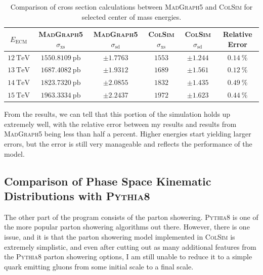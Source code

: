 \begin{table}[h]
  \centering
  \begin{tabular}{|c|c|c|c|c|c|}
    \hline
    $E_{\mathrm{ECM}}$ & \textsc{MadGraph5} $\sigma_{\mathrm{xs}}$ & \textsc{MadGraph5} $\sigma_{\mathrm{sd}}$ & \textsc{ColSim} $\sigma_{\mathrm{xs}}$ & \textsc{ColSim} $\sigma_{\mathrm{sd}}$ & Relative Error \\ \hline
    $\qty{12}{\tera\electronvolt}$ & $\qty{1550.8109}{\pico\barn}$ & $\pm 1.7763$ & $1553$ & $\pm 1.244$ & $\qty{0.14}{\percent}$ \\ \hline
    $\qty{13}{\tera\electronvolt}$ & $\qty{1687.4082}{\pico\barn}$ & $\pm 1.9312$ & $1689$ & $\pm 1.561$ & $\qty{0.12}{\percent}$ \\ \hline
    $\qty{14}{\tera\electronvolt}$ & $\qty{1823.7320}{\pico\barn}$ & $\pm 2.0855$ & $1832$ & $\pm 1.435$ & $\qty{0.49}{\percent}$ \\ \hline
    $\qty{15}{\tera\electronvolt}$ & $\qty{1963.3334}{\pico\barn}$ & $\pm 2.2437$ & $1972$ & $\pm 1.623$ & $\qty{0.44}{\percent}$ \\ \hline
  \end{tabular}
  \caption{Comparison of cross section calculations between \textsc{MadGraph5} and \textsc{ColSim} for selected center of mass energies.}
  \label{tbl:cross-section-comparison}
\end{table}

From the results, we can tell that this portion of the simulation holds up extremely well, with the relative error between my results and results from \textsc{MadGraph5} being less than half a percent. Higher energies start yielding larger errors, but the error is still very manageable and reflects the performance of the model.


\subsection{Comparison of Phase Space Kinematic Distributions with \texorpdfstring{\textsc{Pythia8}}{Pythia8}}

The other part of the program consists of the parton showering. \textsc{Pythia8} is one of the more popular parton showering algorithms out there. However, there is one issue, and it is that the parton showering model implemented in \textsc{ColSim} is extremely simplistic, and even after cutting out as many additional features from the \textsc{Pythia8} parton showering options, I am still unable to reduce it to a simple quark emitting gluons from some initial scale to a final scale.

